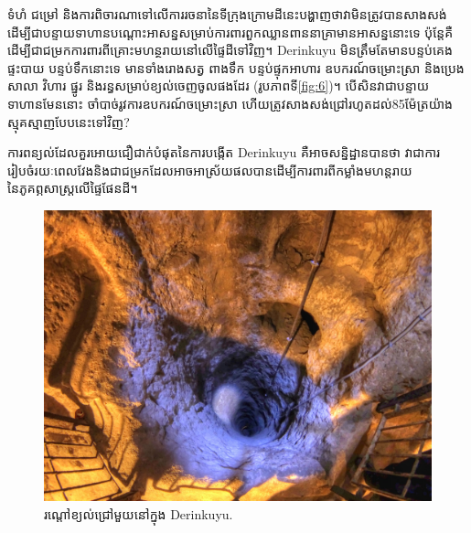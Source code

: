\documentclass[10pt,twocolumn,letterpaper]{article}
\begin{document}
ទំហំ ជម្រៅ និងការពិចារណាទៅលើការរចនានៃទីក្រុងក្រោមដីនេះបង្ហាញថាវាមិនត្រូវបានសាងសង់ដើម្បីជាបន្ទាយទាហានបណ្តោះអាសន្នសម្រាប់ការពារពួកឈ្លានពាននាគ្រាមានអាសន្ននោះទេ ប៉ុន្តែគឺដើម្បីជាជម្រកការពារពីគ្រោះមហន្ថរាយនៅលើផ្ទៃដីទៅវិញ។ Derinkuyu មិនត្រឹមតែមានបន្ទប់គេង ផ្ទះបាយ បន្ទប់ទឹកនោះទេ មានទាំងរោងសត្វ ពាងទឹក បន្ទប់ផ្ទុកអាហារ ឧបករណ៍ចម្រោះស្រា និងប្រេង សាលា វិហារ ផ្នូរ និងរន្ធសម្រាប់ខ្យល់ចេញចូលផងដែរ (រូបភាពទី\ref{fig:6})។ បើសិនវាជាបន្ទាយទាហានមែននោះ ចាំបាច់រូវការឧបករណ៍ចម្រោះស្រា ហើយត្រូវសាងសង់ជ្រៅរហូតដល់85ម៉ែត្រយ៉ាងស្មុគស្មាញបែបនេះទៅវិញ?

ការពន្យល់ដែលគួរអោយជឿជាក់បំផុតនៃការបង្កើត Derinkuyu គឺអាចសន្និដ្ឋានបានថា វាជាការរៀបចំរយៈពេលវែងនិងជាជម្រកដែលអាចអាស្រ័យផលបានដើម្បីការពារពីកម្លាំងមហន្តរាយនៃភូគព្ភសាស្ត្រលើផ្ទៃផែនដី។

\begin{figure}[t]
\begin{center}
   \includegraphics[width=1\linewidth]{derinkuyu-air.jpg}
\end{center}
   \caption{រណ្តៅខ្យល់ជ្រៅមួយនៅក្នុង Derinkuyu\cite{53}.}
\label{fig:6}
\label{fig:onecol}
\end{figure}


\end{document}
